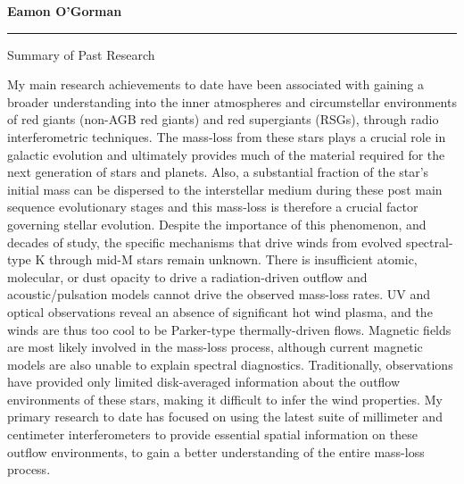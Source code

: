 \documentclass[11pt]{letter} %
\begin{document}




\begin{flushleft}
{\large\bf Eamon O'Gorman}
\end{flushleft}
\medskip\hrule height 1pt
\begin{flushright}


\end{flushright} 
{\Large 
\begin{center}
Summary of Past Research
\end{center}
}

My main research achievements to date have been associated with gaining a broader understanding into the inner atmospheres and circumstellar environments of red giants (non-AGB red giants) and red supergiants (RSGs), through radio interferometric techniques. The mass-loss from these stars plays a crucial role in galactic evolution and ultimately provides much of the material required for the next generation of stars and planets. Also, a substantial fraction of the star's initial mass can be dispersed to the interstellar medium during these post main sequence evolutionary stages and this mass-loss is therefore a crucial factor governing stellar evolution. Despite the importance of this phenomenon, and decades of study, the specific mechanisms that drive winds from evolved spectral-type K through mid-M stars remain unknown. There is insufficient atomic, molecular, or dust opacity to drive a radiation-driven outflow and acoustic/pulsation models cannot drive the observed mass-loss rates. UV and optical observations reveal an absence of significant hot wind plasma, and the winds are thus too cool to be Parker-type thermally-driven flows. Magnetic fields are most likely involved in the mass-loss process, although current magnetic models are also unable to explain spectral diagnostics. Traditionally, observations have provided only limited disk-averaged information about the outflow environments of these stars, making it difficult to infer the wind properties. My primary research to date has focused on using the latest suite of millimeter and centimeter interferometers to provide essential spatial information on these outflow environments, to gain a better understanding of the entire mass-loss process.
\end{document}
